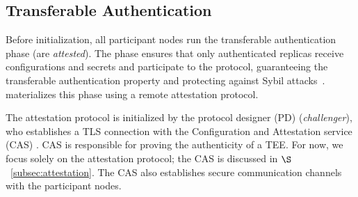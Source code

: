 

\subsection{Transferable Authentication}
\label{sec:attestation}
Before initialization, all participant nodes run the transferable authentication phase (are \emph{attested}). The phase ensures that only authenticated replicas receive configurations and secrets and participate to the protocol, guaranteeing the transferable authentication property and protecting against Sybil attacks~\cite{10.1007/3-540-45748-8_24}. \projecttitle{} materializes this phase using a remote attestation protocol.

The attestation protocol is initialized by the protocol designer (PD) (\emph{challenger}), who establishes a TLS connection with the Configuration and Attestation service (CAS) . CAS is responsible for proving the authenticity of a TEE. For now, we focus solely on the attestation protocol; the CAS is discussed in $\S$~\ref{subsec:attestation}. The CAS also establishes secure communication channels with the participant nodes. 

